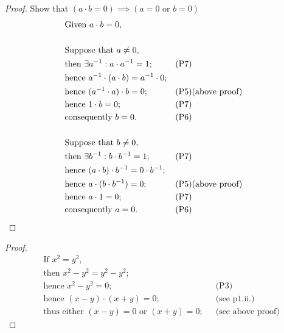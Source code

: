 \documentclass{article}
\begin{document}
\begin{enumerate}[(i).]
            \begin{proof}
                Show that \((a \cdot b = 0) \implies (a = 0 \text{ or } b = 0)\)
                \begin{align*}
                    &\text{Given } a \cdot b = 0 \text{,}\\
                    \\%
                    &\text{Suppose that } a \neq 0 \text{,}\\
                    &\text{then } \exists a^{-1}: a \cdot a^{-1} = 1 \text{;} &&\text{(P7)}\\
                    &\text{hence } a^{-1} \cdot (a \cdot b) = a^{-1} \cdot 0 \text{;}\\
                    &\text{hence } (a^{-1} \cdot a) \cdot b = 0 \text{;} &&\text{(P5)(above proof)}\\
                    &\text{hence } 1 \cdot b = 0 \text{;} &&\text{(P7)}\\
                    &\text{consequently } b = 0 \text{.} &&\text{(P6)}\\
                    \\%
                    &\text{Suppose that } b \neq 0 \text{,}\\
                    &\text{then } \exists b^{-1}: b \cdot b^{-1} = 1 \text{;} &&\text{(P7)}\\
                    &\text{hence } (a \cdot b) \cdot b^{-1} = 0 \cdot b^{-1} \text{;}\\
                    &\text{hence } a \cdot (b \cdot b^{-1}) = 0 \text{;} &&\text{(P5)(above proof)}\\
                    &\text{hence } a \cdot 1 = 0 \text{;} &&\text{(P7)}\\
                    &\text{consequently } a = 0 \text{.} &&\text{(P6)} \qedhere
                \end{align*}
            \end{proof}

            \begin{proof}
                \begin{align*}
                    &\text{If } x^{2} = y^{2} \text{,}\\
                    &\text{then } x^{2} - y^{2} = y^{2} - y^{2} \text{;}\\
                    &\text{hence } x^{2} - y^{2} = 0 \text{;} &&\text{(P3)}\\
                    &\text{hence } (x - y)\cdot(x + y) = 0 \text{;} &&\text{(see p1.ii.)}\\
                    &\text{thus either } (x - y) = 0 \text{ or } (x + y) = 0 \text{;} && \text{(see above proof)}
                \end{align*}


\end{proof}
\end{enumerate}
\end{document}
